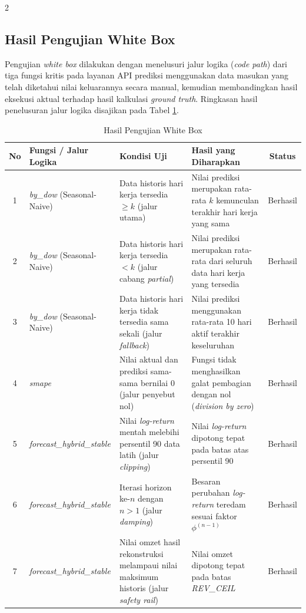 \documentclass[12pt, a4paper, onecolumn, oneside]{report}
\begin{document}
\begin{spacing}{2}
\subsection{Hasil Pengujian White Box}

Pengujian \textit{white box} dilakukan dengan menelusuri jalur logika (\textit{code path}) dari tiga fungsi kritis pada layanan API prediksi menggunakan data masukan yang telah diketahui nilai keluarannya secara manual, kemudian membandingkan hasil eksekusi aktual terhadap hasil kalkulasi \textit{ground truth}. Ringkasan hasil penelusuran jalur logika disajikan pada Tabel \ref{tab:hasil_whitebox}.

\begin{table}[H]
\centering
\caption{Hasil Pengujian White Box}
\label{tab:hasil_whitebox}
\begin{tabularx}{\textwidth}{|c|X|X|X|c|}
\hline
\textbf{No} & \textbf{Fungsi / Jalur Logika} & \textbf{Kondisi Uji} & \textbf{Hasil yang Diharapkan} & \textbf{Status} \\
\hline
1 & \textit{by\_dow} (Seasonal-Naive) & Data historis hari kerja tersedia $\geq k$ (jalur utama) & Nilai prediksi merupakan rata-rata $k$ kemunculan terakhir hari kerja yang sama & Berhasil \\
\hline
2 & \textit{by\_dow} (Seasonal-Naive) & Data historis hari kerja tersedia $<k$ (jalur cabang \textit{partial}) & Nilai prediksi merupakan rata-rata dari seluruh data hari kerja yang tersedia & Berhasil \\
\hline
3 & \textit{by\_dow} (Seasonal-Naive) & Data historis hari kerja tidak tersedia sama sekali (jalur \textit{fallback}) & Nilai prediksi menggunakan rata-rata 10 hari aktif terakhir keseluruhan & Berhasil \\
\hline
4 & \textit{smape} & Nilai aktual dan prediksi sama-sama bernilai 0 (jalur penyebut nol) & Fungsi tidak menghasilkan galat pembagian dengan nol (\textit{division by zero}) & Berhasil \\
\hline
5 & {\small\textit{forecast\_hybrid\_\allowbreak stable}} & Nilai \textit{log-return} mentah melebihi persentil 90 data latih (jalur \textit{clipping}) & Nilai \textit{log-return} dipotong tepat pada batas atas persentil 90 & Berhasil \\
\hline
6 & {\small\textit{forecast\_hybrid\_\allowbreak stable}} & Iterasi horizon ke-$n$ dengan $n>1$ (jalur \textit{damping}) & Besaran perubahan \textit{log-return} teredam sesuai faktor $\phi^{(n-1)}$ & Berhasil \\
\hline
7 & {\small\textit{forecast\_hybrid\_\allowbreak stable}} & Nilai omzet hasil rekonstruksi melampaui nilai maksimum historis (jalur \textit{safety rail}) & Nilai omzet dipotong tepat pada batas \textit{REV\_CEIL} & Berhasil \\
\hline
\end{tabularx}
\end{table}


\end{spacing}
\end{document}
